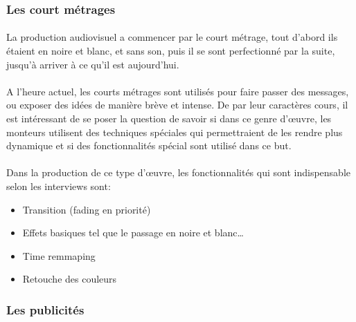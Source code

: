     \subsubsection{Les court métrages}
      \paragraph{}
      La production audiovisuel a commencer par le court métrage, tout d'abord ils
      étaient en noire et blanc, et sans son, puis il se sont perfectionné par la suite,
      jusqu'à arriver à ce qu'il est aujourd'hui.

      \paragraph{}
      A l'heure actuel, les courts métrages sont utilisés pour faire passer des messages,
      ou exposer des idées de manière brève et intense. De par leur caractères
      cours, il est intéressant de se poser la question de savoir si dans ce genre
      d'œuvre, les monteurs utilisent des techniques spéciales qui permettraient
      de les rendre plus dynamique et si des fonctionnalités spécial sont utilisé dans
      ce but.
      \paragraph{}
        Dans la production de ce type d'œuvre, les fonctionnalités qui sont indispensable
        selon les interviews sont:
        \begin{itemize}
          \item{Transition (fading en priorité)}
          \item{Effets basiques tel que le passage en noire et blanc\ldots}
          \item{Time remmaping}
          \item{Retouche des couleurs}
        \end{itemize}

    \subsubsection {Les publicités}
